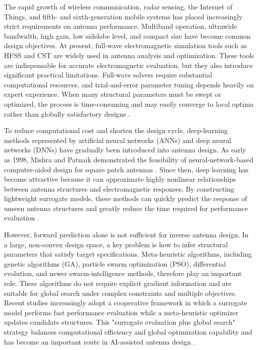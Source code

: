 \documentclass{article}
\begin{document}
The rapid growth of wireless communication, radar sensing, the Internet of Things, and fifth- and sixth-generation mobile systems has placed increasingly strict requirements on antenna performance. Multiband operation, ultrawide bandwidth, high gain, low sidelobe level, and compact size have become common design objectives. At present, full-wave electromagnetic simulation tools such as HFSS and CST are widely used in antenna analysis and optimization. These tools are indispensable for accurate electromagnetic evaluation, but they also introduce significant practical limitations. Full-wave solvers require substantial computational resources, and trial-and-error parameter tuning depends heavily on expert experience. When many structural parameters must be swept or optimized, the process is time-consuming and may easily converge to local optima rather than globally satisfactory designs \cite{sarker2023review,misilmani2020review,khan2022review}.

To reduce computational cost and shorten the design cycle, deep-learning methods represented by artificial neural networks (ANNs) and deep neural networks (DNNs) have gradually been introduced into antenna design. As early as 1998, Mishra and Patnaik demonstrated the feasibility of neural-network-based computer-aided design for square patch antennas \cite{mishra1998square}. Since then, deep learning has become attractive because it can approximate highly nonlinear relationships between antenna structures and electromagnetic responses. By constructing lightweight surrogate models, these methods can quickly predict the response of unseen antenna structures and greatly reduce the time required for performance evaluation \cite{li2019deepnis,yao2018fdtd,zhang2003ann,lecun2015deep,shi2018emc,feng2022ann}.

However, forward prediction alone is not sufficient for inverse antenna design. In a large, non-convex design space, a key problem is how to infer structural parameters that satisfy target specifications. Meta-heuristic algorithms, including genetic algorithms (GA), particle swarm optimization (PSO), differential evolution, and newer swarm-intelligence methods, therefore play an important role. These algorithms do not require explicit gradient information and are suitable for global search under complex constraints and multiple objectives. Recent studies increasingly adopt a cooperative framework in which a surrogate model performs fast performance evaluation while a meta-heuristic optimizer updates candidate structures. This "surrogate evaluation plus global search" strategy balances computational efficiency and global optimization capability and has become an important route in AI-assisted antenna design \cite{singh2024polygon,huang2024meta,pietrenko2023resolution,yang2026gphercnn}.
\end{document}
